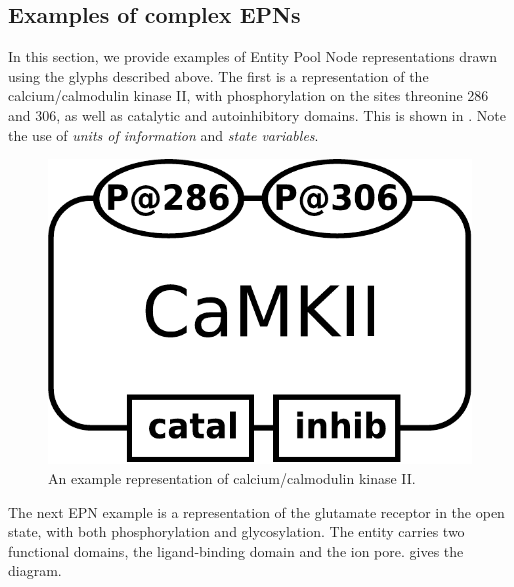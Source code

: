 
\subsection{Examples of complex EPNs}
\label{sec:CplxEPNs}

In this section, we provide examples of Entity Pool Node representations drawn using the \SBGNPDLone glyphs described above.  The first is a representation of the calcium/calmodulin kinase II, with phosphorylation on the sites threonine 286 and 306, as well as catalytic and autoinhibitory domains.  This is shown in .  Note the use of \emph{units of information} and \emph{state variables}.

\begin{figure}[H]
  \centering
  \includegraphics[scale = 0.3]{examples/macromolecule-CaMKII}
  \caption{An example representation of calcium/calmodulin kinase II.}
  \label{fig:example-camkii}
\end{figure}

The next EPN example is a representation of the glutamate receptor in the open state, with both phosphorylation and glycosylation.  The entity carries two functional domains, the ligand-binding domain and the ion pore.   gives the diagram.


